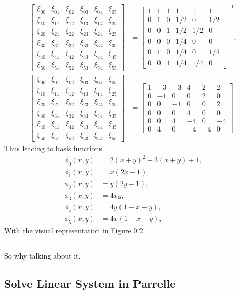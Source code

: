 \documentclass[12pt,a4paper]{article}
\begin{document}
\begin{align}
\left[ \begin{matrix}
\xi_{00} & \xi_{01} & \xi_{02} & \xi_{03} & \xi_{04} & \xi_{05}\\
\xi_{10} & \xi_{11} & \xi_{12} & \xi_{13} & \xi_{14} & \xi_{25}\\
\xi_{20} & \xi_{21} & \xi_{22} & \xi_{23} & \xi_{24} & \xi_{25}\\
\xi_{30} & \xi_{31} & \xi_{32} & \xi_{33} & \xi_{34} & \xi_{35}\\
\xi_{40} & \xi_{41} & \xi_{42} & \xi_{43} & \xi_{44} & \xi_{45}\\
\xi_{50} & \xi_{51} & \xi_{52} & \xi_{53} & \xi_{54} & \xi_{55}
\end{matrix} \right] &= 
\left[ \begin{matrix}
1 & 1 & 1 & 1 & 1 & 1\\
0 & 1 & 0 & 1/2 & 0 & 1/2\\
0 & 0 & 1 & 1/2 & 1/2 & 0\\
0 & 0 & 0 & 1/4 & 0 & 0\\
0 & 1 & 0 & 1/4 & 0 & 1/4\\
0 & 0 & 1 & 1/4 & 1/4 & 0
\end{matrix} \right]^{-1}, \\
\left[ \begin{matrix}
\xi_{00} & \xi_{01} & \xi_{02} & \xi_{03} & \xi_{04} & \xi_{05}\\
\xi_{10} & \xi_{11} & \xi_{12} & \xi_{13} & \xi_{14} & \xi_{25}\\
\xi_{20} & \xi_{21} & \xi_{22} & \xi_{23} & \xi_{24} & \xi_{25}\\
\xi_{30} & \xi_{31} & \xi_{32} & \xi_{33} & \xi_{34} & \xi_{35}\\
\xi_{40} & \xi_{41} & \xi_{42} & \xi_{43} & \xi_{44} & \xi_{45}\\
\xi_{50} & \xi_{51} & \xi_{52} & \xi_{53} & \xi_{54} & \xi_{55}
\end{matrix} \right] &= 
\left[ \begin{matrix}
1 & -3 & -3 & 4 & 2 & 2\\
0 & -1 & 0 & 0 & 2 & 0\\
0 & 0 & -1 & 0 & 0 & 2\\
0 & 0 & 0 & 4 & 0 & 0\\
0 & 0 & 4 & -4 & 0 & -4\\
0 & 4 & 0 & -4 & -4 & 0
\end{matrix} \right]
\end{align}
Thus leading to basis functions
\begin{align}
\phi_0(x,y) &= 2(x+y)^2 - 3(x+y) + 1, \\
\phi_1(x,y) &= x(2x-1), \\
\phi_2(x,y) &= y(2y-1), \\
\phi_3(x,y) &= 4xy, \\
\phi_4(x,y) &= 4y(1-x-y), \\
\phi_5(x,y) &= 4x(1-x-y),
\end{align}
With the visual representation in Figure \ref{}


\subsection{}
So why talking about it.

\subsection{Solve Linear System in Parrelle}
\end{document}
